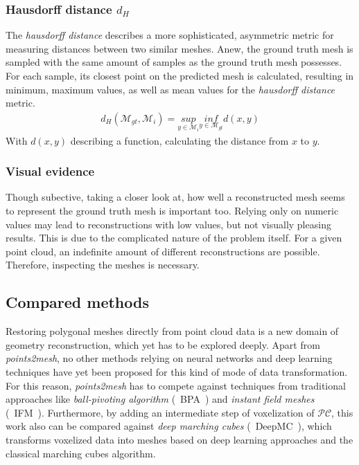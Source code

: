     \subsubsection*{Hausdorff distance $d_H$}
    The \emph{hausdorff distance} describes a more sophisticated, asymmetric metric for measuring distances between two similar meshes. 
    Anew, the ground truth mesh is sampled with the same amount of samples as the ground truth mesh possesses. For each sample, its 
    closest point on the predicted mesh is calculated, resulting in minimum, maximum values, as well as mean values for the \emph{hausdorff distance} metric.
    \begin{align}
        d_{H}(\mathcal{M}_{gt},\mathcal{M}_i) = \underset{y\in\mathcal{M}_i}{sup} \underset{y\in\mathcal{M}_{gt}}{inf} d(x,y)
    \end{align}
    With $d(x,y)$ describing a function, calculating the distance from $x$ to $y$.
    \subsubsection*{Visual evidence}    
    Though subective, taking a closer look at, how well a reconstructed mesh seems to represent the ground truth mesh is important too. Relying only on 
    numeric values may lead to reconstructions with low values, but not visually pleasing results. This is due to the complicated nature of the problem itself.
    For a given point cloud, an indefinite amount of different reconstructions are possible. Therefore, inspecting the meshes is necessary.

\subsection{Compared methods}

    Restoring polygonal meshes directly from point cloud data is a new domain of geometry reconstruction, 
    which yet has to be explored deeply. Apart from \emph{points2mesh}, no other methods relying on neural 
    networks and deep learning techniques have yet been proposed for this kind of mode of data transformation.
    For this reason, \emph{points2mesh} has to compete against techniques from traditional approaches like
    \emph{ball-pivoting algorithm} \cite{817351}(~BPA~) and \emph{instant field meshes} \cite{Jakob2015Instant} (~IFM~). Furthermore, by adding
    an intermediate step of voxelization of $\mathcal{PC}$, this work also can be compared against 
    \emph{deep marching cubes} \cite{Liao2018CVPR} (~DeepMC~), which transforms voxelized data into meshes based on deep learning approaches and the classical
    marching cubes algorithm.

